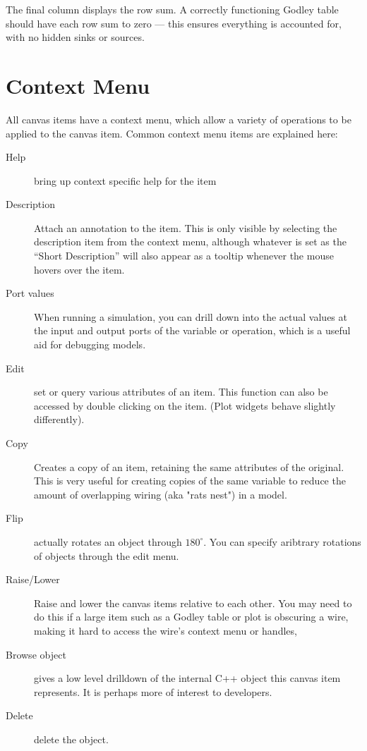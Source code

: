 The final column displays the row sum. A correctly functioning Godley
table should have each row sum to zero --- this ensures everything is
accounted for, with no hidden sinks or sources.

\section{Context Menu}

All canvas items have a context menu, which allow a variety of
operations to be applied to the canvas item. Common context menu items
are explained here:
\begin{description}
\item[Help] bring up context specific help for the item
\item[Description] Attach an annotation to the item. This is only
visible by selecting the description item from the context menu,
although whatever is set as the ``Short Description'' will also appear
as a tooltip whenever the mouse hovers over the item.
\item[Port values] When running a simulation, you can drill down into
the actual values at the input and output ports of the variable or
operation, which is a useful aid for debugging models.
\item[Edit] set or query various attributes of an item. This function
can also be accessed by double clicking on the item. (Plot widgets
behave slightly differently).
\item[Copy] Creates a copy of an item, retaining the same attributes
of the original. This is very useful for creating copies of the same
variable to reduce the amount of overlapping wiring (aka "rats nest")
in a model.
\item[Flip] actually rotates an object through $180^\circ$. You can
specify aribtrary rotations of objects through the edit menu.
\item[Raise/Lower] Raise and lower the canvas items relative to each
other. You may need to do this if a large item such as a Godley table
or plot is obscuring a wire, making it hard to access the wire's
context menu or handles,
\item[Browse object] gives a low level drilldown of the internal C++
object this canvas item represents. It is perhaps more of interest to
developers. 
\item[Delete] delete the object.
\end{description}

